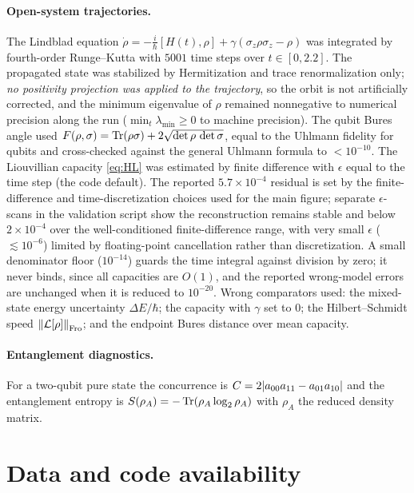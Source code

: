 \documentclass[12pt]{article}
\begin{document}
\paragraph{Open-system trajectories.}
The Lindblad equation \(\dot\rho=-\tfrac{i}{\hbar}[H(t),\rho]+\gamma(\sigma_z\rho\sigma_z-\rho)\) was integrated by fourth-order Runge--Kutta with \(5001\) time steps over \(t\in[0,2.2]\). The propagated state was stabilized by Hermitization and trace renormalization only; \emph{no positivity projection was applied to the trajectory}, so the orbit is not artificially corrected, and the minimum eigenvalue of \(\rho\) remained nonnegative to numerical precision along the run (\(\min_t\lambda_{\min}\ge0\) to machine precision). The qubit Bures angle used \(F(\rho,\sigma)=\Tr(\rho\sigma)+2\sqrt{\det\rho\,\det\sigma}\), equal to the Uhlmann fidelity for qubits and cross-checked against the general Uhlmann formula to \(<10^{-10}\). The Liouvillian capacity \eqref{eq:HL} was estimated by finite difference with \(\epsilon\) equal to the time step (the code default). The reported \(5.7\times10^{-4}\) residual is set by the finite-difference and time-discretization choices used for the main figure; separate \(\epsilon\)-scans in the validation script show the reconstruction remains stable and below \(2\times10^{-4}\) over the well-conditioned finite-difference range, with very small \(\epsilon\) (\(\lesssim10^{-6}\)) limited by floating-point cancellation rather than discretization. A small denominator floor (\(10^{-14}\)) guards the time integral against division by zero; it never binds, since all capacities are \(O(1)\), and the reported wrong-model errors are unchanged when it is reduced to \(10^{-20}\). Wrong comparators used: the mixed-state energy uncertainty \(\Delta E/\hbar\); the capacity with \(\gamma\) set to \(0\); the Hilbert--Schmidt speed \(\norm{\mathcal L[\rho]}_{\rm Fro}\); and the endpoint Bures distance over mean capacity.

\paragraph{Entanglement diagnostics.}
For a two-qubit pure state the concurrence is \(C=2\abs{a_{00}a_{11}-a_{01}a_{10}}\) and the entanglement entropy is \(S(\rho_A)=-\Tr(\rho_A\log_2\rho_A)\) with \(\rho_A\) the reduced density matrix.

\section*{Data and code availability}
\end{document}
